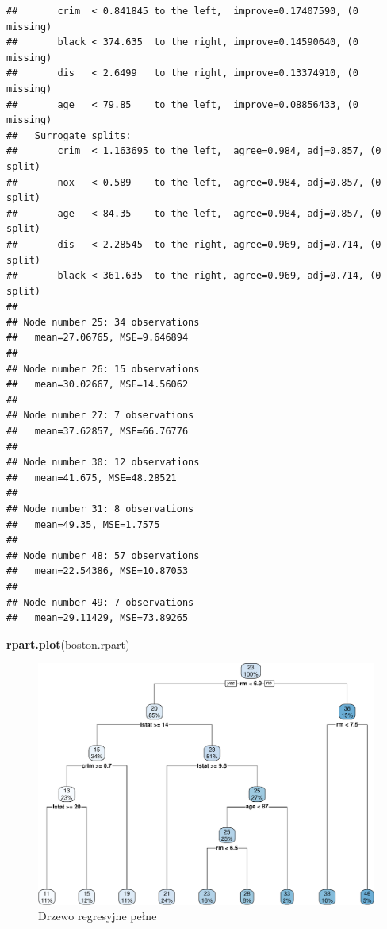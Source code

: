 \documentclass[]{book}
\newenvironment{Shaded}{\begin{snugshade}}{\end{snugshade}}
\newcommand{\KeywordTok}[1]{\textcolor[rgb]{0.13,0.29,0.53}{\textbf{#1}}}
\newcommand{\NormalTok}[1]{#1}
\theoremstyle{plain}
\theoremstyle{definition}
\theoremstyle{definition}
\theoremstyle{definition}
\theoremstyle{definition}
\theoremstyle{remark}
\begin{document}
\begin{verbatim}
##       crim  < 0.841845 to the left,  improve=0.17407590, (0 missing)
##       black < 374.635  to the right, improve=0.14590640, (0 missing)
##       dis   < 2.6499   to the right, improve=0.13374910, (0 missing)
##       age   < 79.85    to the left,  improve=0.08856433, (0 missing)
##   Surrogate splits:
##       crim  < 1.163695 to the left,  agree=0.984, adj=0.857, (0 split)
##       nox   < 0.589    to the left,  agree=0.984, adj=0.857, (0 split)
##       age   < 84.35    to the left,  agree=0.984, adj=0.857, (0 split)
##       dis   < 2.28545  to the right, agree=0.969, adj=0.714, (0 split)
##       black < 361.635  to the right, agree=0.969, adj=0.714, (0 split)
## 
## Node number 25: 34 observations
##   mean=27.06765, MSE=9.646894 
## 
## Node number 26: 15 observations
##   mean=30.02667, MSE=14.56062 
## 
## Node number 27: 7 observations
##   mean=37.62857, MSE=66.76776 
## 
## Node number 30: 12 observations
##   mean=41.675, MSE=48.28521 
## 
## Node number 31: 8 observations
##   mean=49.35, MSE=1.7575 
## 
## Node number 48: 57 observations
##   mean=22.54386, MSE=10.87053 
## 
## Node number 49: 7 observations
##   mean=29.11429, MSE=73.89265
\end{verbatim}

\begin{Shaded}
\begin{Highlighting}[]
\KeywordTok{rpart.plot}\NormalTok{(boston.rpart)}
\end{Highlighting}
\end{Shaded}

\begin{figure}
\centering
\includegraphics{EksploracjaDanych_files/figure-latex/unnamed-chunk-32-1.pdf}
\caption{\label{fig:unnamed-chunk-32}Drzewo regresyjne pełne}
\end{figure}
\end{document}
